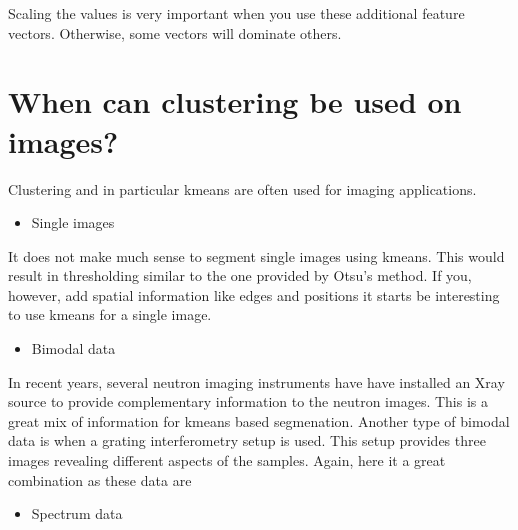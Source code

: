 \documentclass[letterpaper,10pt,english]{sphinxmanual}
\begin{document}
\begin{sphinxVerbatim}[commandchars=\\\{\}]
\PYG{p}{[}\PYG{p}{]} \PYG{p}{[}\PYG{p}{]}
\end{sphinxVerbatim}

\noindent{}

Scaling the values is very important when you use these additional feature vectors. Otherwise, some vectors will dominate others.


\section{When can clustering be used on images?}
\label{\detokenize{ML4NeutronImageSegmentation:when-can-clustering-be-used-on-images}}
Clustering and in particular k\sphinxhyphen{}means are often used for imaging applications.
\begin{itemize}
\item {} 
Single images

\end{itemize}

It does not make much sense to segment single images using k\sphinxhyphen{}means. This would result in thresholding similar to the one provided by Otsu’s method. If you, however, add spatial information like edges and positions it starts be interesting to use k\sphinxhyphen{}means for a single image.
\begin{itemize}
\item {} 
Bimodal data

\end{itemize}

In recent years, several neutron imaging instruments have have installed an X\sphinxhyphen{}ray source to provide complementary information to the neutron images. This is a great mix of information for k\sphinxhyphen{}means based segmenation. Another type of bimodal data is when a grating interferometry setup is used. This setup provides three images revealing different aspects of the samples. Again, here it a great combination as these data are
\begin{itemize}
\item {} 
Spectrum data

\end{itemize}
\end{document}
